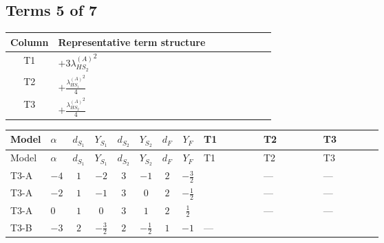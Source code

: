 \documentclass[8pt]{article}
\begin{document}
\begin{landscape}
\subsection*{Terms 5 of 7}
\begin{center}
\begin{tabular}{@{}c >{\raggedright\arraybackslash}p{0.82\linewidth}@{}}
\toprule
Column & Representative term structure \\
\midrule
T1 & \(\displaystyle +3 {\lambda_{HS_2}^{(A)}}^2\) \\
\midrule
T2 & \(\displaystyle +\frac{{\lambda_{HS_1}^{(A)}}^2}{4}\) \\
\midrule
T3 & \(\displaystyle +\frac{{\lambda_{HS_2}^{(A)}}^2}{4}\) \\
\midrule
\bottomrule
\end{tabular}
\end{center}
\smallskip
\tiny
\begin{longtable}{@{}llcccccc >{\raggedright\arraybackslash}p{0.21\linewidth} >{\raggedright\arraybackslash}p{0.21\linewidth} >{\raggedright\arraybackslash}p{0.21\linewidth}@{}}
\toprule
Model & $\alpha$ & $d_{S_1}$ & $Y_{S_1}$ & $d_{S_2}$ & $Y_{S_2}$ & $d_F$ & $Y_F$ & T1 & T2 & T3 \\
\midrule
\endfirsthead
\toprule
Model & $\alpha$ & $d_{S_1}$ & $Y_{S_1}$ & $d_{S_2}$ & $Y_{S_2}$ & $d_F$ & $Y_F$ & T1 & T2 & T3 \\
\midrule
\endhead
T3-A & $-4$ & $1$ & $-2$ & $3$ & $-1$ & $2$ & $-\frac{3}{2}$ & \scriptsize\adjustbox{max width=\linewidth}{$\begin{gathered} +3 {\lambda_{HS_2}^{(A)}}^2\end{gathered}$} & --- & --- \\
\midrule
T3-A & $-2$ & $1$ & $-1$ & $3$ & $0$ & $2$ & $-\frac{1}{2}$ & \scriptsize\adjustbox{max width=\linewidth}{$\begin{gathered} +3 {\lambda_{HS_2}^{(A)}}^2\end{gathered}$} & --- & --- \\
\midrule
T3-A & $0$ & $1$ & $0$ & $3$ & $1$ & $2$ & $\frac{1}{2}$ & \scriptsize\adjustbox{max width=\linewidth}{$\begin{gathered} +3 {\lambda_{HS_2}^{(A)}}^2\end{gathered}$} & --- & --- \\
\midrule
T3-B & $-3$ & $2$ & $-\frac{3}{2}$ & $2$ & $-\frac{1}{2}$ & $1$ & $-1$ & --- & \scriptsize\adjustbox{max width=\linewidth}{$\begin{gathered} +\frac{{\lambda_{HS_1}^{(A)}}^2}{4}\end{gathered}$} & \scriptsize\adjustbox{max width=\linewidth}{$\begin{gathered} +\frac{{\lambda_{HS_2}^{(A)}}^2}{4}\end{gathered}$} \\

\end{longtable}
\end{landscape}
\end{document}
